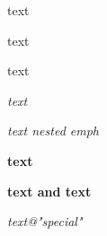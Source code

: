 \documentclass[12pt]{article}
\newcommand\"{quote}
\begin{document}

\inputminted{py}{path/to/file.py}



\textnormal{text}

\textrm{text}

\textsf{text}

\emph{text}

\emph{text \emph{nested} emph}

\textbf{text}

\textbf{text \command and text}


\textit{text@"special"}
\end{document}

